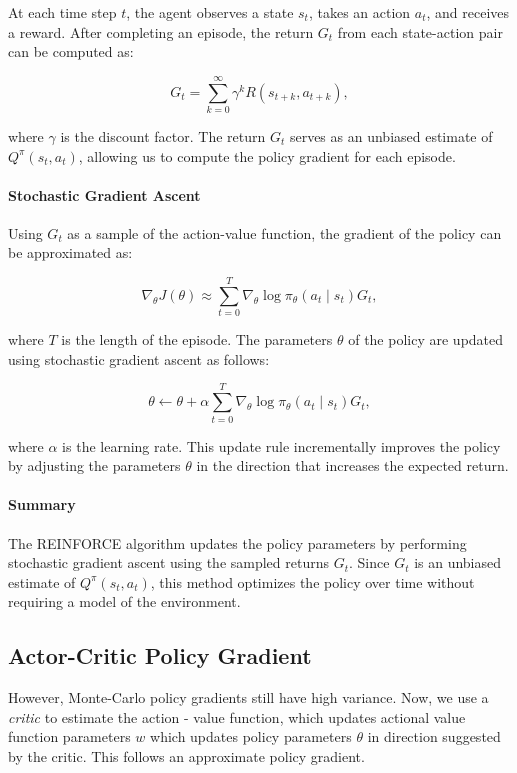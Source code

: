 \documentclass[10pt, oneside]{article}
\theoremstyle{definition}
\begin{document}
At each time step \( t \), the agent observes a state \( s_t \), takes an action \( a_t \), and receives a reward. After completing an episode, the return \( G_t \) from each state-action pair can be computed as:

\[
G_t = \sum_{k=0}^{\infty} \gamma^k R(s_{t+k}, a_{t+k}),
\]

where \( \gamma \) is the discount factor. The return \( G_t \) serves as an unbiased estimate of \( Q^\pi(s_t, a_t) \), allowing us to compute the policy gradient for each episode.

\paragraph{Stochastic Gradient Ascent}

Using \( G_t \) as a sample of the action-value function, the gradient of the policy can be approximated as:

\[
\nabla_\theta J(\theta) \approx \sum_{t=0}^{T} \nabla_\theta \log \pi_\theta(a_t \mid s_t) G_t,
\]

where \( T \) is the length of the episode. The parameters \( \theta \) of the policy are updated using stochastic gradient ascent as follows:

\[
\theta \leftarrow \theta + \alpha \sum_{t=0}^{T} \nabla_\theta \log \pi_\theta(a_t \mid s_t) G_t,
\]

where \( \alpha \) is the learning rate. This update rule incrementally improves the policy by adjusting the parameters \( \theta \) in the direction that increases the expected return.

\paragraph{Summary}

The REINFORCE algorithm updates the policy parameters by performing stochastic gradient ascent using the sampled returns \( G_t \). Since \( G_t \) is an unbiased estimate of \( Q^\pi(s_t, a_t) \), this method optimizes the policy over time without requiring a model of the environment.

\subsection{Actor-Critic Policy Gradient}
However, Monte-Carlo policy gradients still have high variance. Now, we use a \textit{critic} to estimate the action - value function, which updates actional value function parameters $w$ which updates policy parameters $\theta$ in direction suggested by the critic. This follows an approximate policy gradient. 
\end{document}
